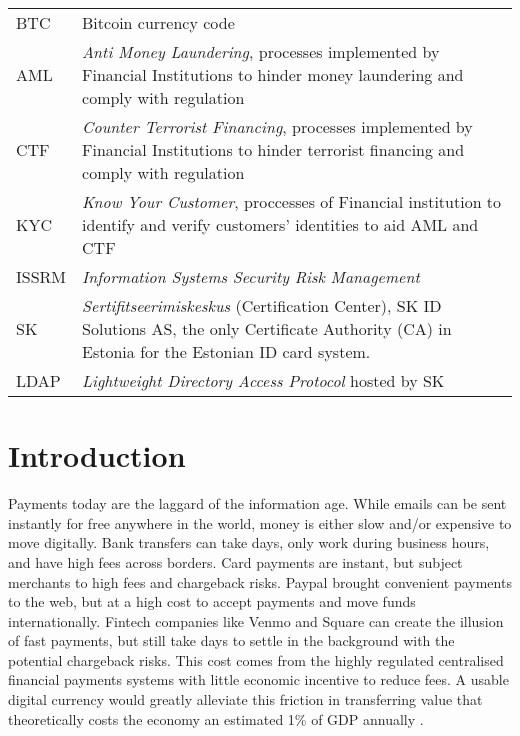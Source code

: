 \documentclass[12pt]{article} %
\begin{document}
\begin{tabular}{p{3 cm} p{10cm}}
BTC & Bitcoin currency code\\
AML & \textit{Anti Money Laundering}, processes implemented by Financial Institutions to hinder money laundering and comply with regulation\\
CTF & \textit{Counter Terrorist Financing}, processes implemented by Financial Institutions to hinder terrorist financing and comply with regulation\\
KYC & \textit{Know Your Customer}, proccesses of Financial institution to identify and verify customers' identities to aid AML and CTF\\
ISSRM & \textit{Information Systems Security Risk Management} \\
SK & \textit{Sertifitseerimiskeskus} (Certification Center), SK ID Solutions AS, the only Certificate Authority (CA) in Estonia for the Estonian ID card system. \\
LDAP & \textit{Lightweight Directory Access Protocol} hosted by SK
\end{tabular}

\pagebreak

\tableofcontents
\newpage

\listoffigures
\pagebreak

\listoftables
\pagebreak

\section{Introduction} \label{sec:1}

Payments today are the laggard of the information age. While emails can be sent instantly for free anywhere in the world, money is either slow and/or expensive to move digitally. Bank transfers can take days, only work during business hours, and have high fees across borders. Card payments are instant, but subject merchants to high fees and chargeback risks. Paypal brought convenient payments to the web, but at a high cost to accept payments and move funds internationally. Fintech companies like Venmo and Square can create the illusion of fast payments, but still take days to settle in the background with the potential chargeback risks. This cost comes from the highly regulated centralised financial payments systems with little economic incentive to reduce fees. A usable digital currency would greatly alleviate this friction in transferring value that theoretically costs the economy an estimated 1\% of GDP annually \cite{kaarmann2013cost}.
\end{document}
